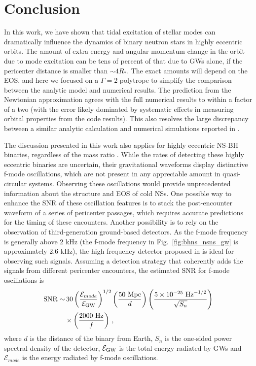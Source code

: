 \documentclass[prd,aps,floatfix,superscriptaddress,nofootinbib,twocolumn,10pt,English]{revtex4}
\begin{document}
\section{Conclusion}
In this work, we have shown that tidal excitation of stellar modes can dramatically
influence the dynamics of binary neutron stars in highly eccentric orbits.
The amount of extra energy and angular momentum
change in the orbit due to mode excitation can be tens of percent
of that due to GWs alone, if the pericenter distance is smaller
than $\sim 4 R_*$. The exact amounts will depend on the EOS, 
and here we focused on a $\Gamma=2$ polytrope
to simplify the comparison between the analytic model and
numerical results.
The prediction from the Newtonian approximation
agrees with the full numerical results to within a factor of
a two (with the error likely dominated by systematic effects in measuring
orbital properties from the code results).
This also resolves the large discrepancy between a similar analytic calculation and
numerical simulations reported in \cite{chirenti2016gravitational}.

The discussion presented in this work also applies for highly eccentric NS-BH
binaries, regardless of the mass ratio \cite{yang2018can}. While the rates of
detecting these highly eccentric binaries are uncertain, their gravitational
waveforms display distinctive f-mode oscillations, which are not present
in any appreciable amount in quasi-circular systems.  Observing these oscillations
would provide unprecedented information about the structure and EOS of cold NSs.
One possible way to enhance the SNR of these oscillation features is to
stack the post-encounter waveform of a series of pericenter passages, which
requires accurate predictions for the timing of these encounters. Another
possibility is to rely on the observation of third-generation ground-based
detectors. As the f-mode frequency is generally above 2 kHz (the  f-mode
frequency in Fig.~\ref{fig:bhns_nsns_gw} is approximately 2.6 kHz), the
high frequency detector proposed in \cite{miao2017towards} is ideal for 
observing such signals. Assuming a detection strategy that coherently adds the signals from different pericenter encounters, the estimated SNR for f-mode oscillations is
\begin{align}
{\rm SNR} \sim & \,30 \left ( \frac{\mathcal{E}_{mode}}{\mathcal{E}_{\rm GW}}\right )^{1/2} \left( \frac{50 {\rm \ Mpc}}{d}\right ) \left ( \frac{5 \times 10^{-25} {\rm \ Hz}^{-1/2}}{\sqrt{S_n}}\right ) \nonumber \\ & \times \left ( \frac{2000 {\rm \ Hz}}{f}\right )\,,
\end{align}
where $d$ is the distance of the binary from Earth, $S_n$ is the one-sided power spectral density of the detector, $\mathcal{E}_{\rm GW}$ is the total energy radiated by GWs and $\mathcal{E}_{mode}$ is the energy radiated by f-mode oscillations.
\end{document}
